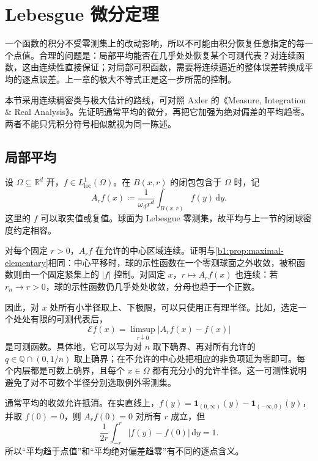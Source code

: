 \section{Lebesgue 微分定理}
\label{b1:sec:1402}

一个函数的积分不受零测集上的改动影响，所以不可能由积分恢复任意指定的每一个点值。合理的问题是：局部平均能否在几乎处处恢复某个可测代表？对连续函数，这由连续性直接保证；对局部可积函数，需要将连续逼近的整体误差转换成平均的逐点误差。上一章的极大不等式正是这一步所需的控制。

\ProseParagraphBreak

本节采用连续稠密类与极大估计的路线，可对照 Axler 的《Measure, Integration \& Real Analysis》\cite[4.10 Lebesgue Differentiation Theorem, first version]{Axler2020Measure}。先证明通常平均的微分，再把它加强为绝对偏差的平均趋零。两者不能只凭积分符号相似就视为同一陈述。

\subsection{局部平均}
\label{b1:subsec:140201}

设 \(\Omega\subseteq\mathbb R^d\) 开，\(f\in L^1_{\mathrm{loc}}(\Omega)\)。在 \(B(x,r)\) 的闭包包含于 \(\Omega\) 时，记
\[
 A_rf(x)\coloneqq\frac1{\omega_dr^d}\int_{B(x,r)}f(y)\,\mathrm dy.
\]
这里的 \(f\) 可以取实值或复值。球面为 Lebesgue 零测集，故平均与上一节的闭球密度约定相容。

\ProseParagraphBreak

对每个固定 \(r>0\)，\(A_rf\) 在允许的中心区域连续。证明与\cref{b1:prop:maximal-elementary}相同：中心平移时，球的示性函数在一个零测球面之外收敛，被积函数则由一个固定紧集上的 \(|f|\) 控制。对固定 \(x\)，\(r\mapsto A_rf(x)\) 也连续：若 \(r_n\to r>0\)，球的示性函数仍几乎处处收敛，分母也趋于一个正数。

\ProseParagraphBreak

因此，对 \(x\) 处所有小半径取上、下极限，可以只使用正有理半径。比如，选定一个处处有限的可测代表后，
\[
 \mathcal E f(x)=\limsup_{r\downarrow0}|A_rf(x)-f(x)|
\]
是可测函数。具体地，它可以写为对 \(n\) 取下确界、再对所有允许的 \(q\in\mathbb Q\cap(0,1/n)\) 取上确界；在不允许的中心处把相应的非负项延为零即可。每个内层都是可数上确界，且每个 \(x\in\Omega\) 都有充分小的允许半径。这一可测性说明避免了对不可数个半径分别选取例外零测集。

\ProseParagraphBreak

通常平均的收敛允许抵消。在实直线上，\(f(y)=\mathbf1_{(0,\infty)}(y)-\mathbf1_{(-\infty,0)}(y)\)，并取 \(f(0)=0\)，则 \(A_rf(0)=0\) 对所有 \(r\) 成立，但
\[
 \frac1{2r}\int_{-r}^r|f(y)-f(0)|\,\mathrm dy=1.
\]
所以“平均趋于点值”和“平均绝对偏差趋零”有不同的逐点含义。

